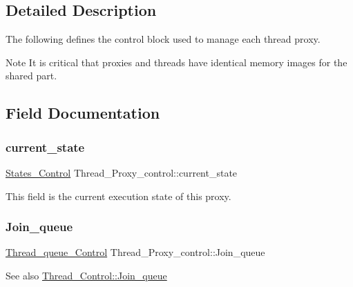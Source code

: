 \subsection{Detailed Description}
The following defines the control block used to manage each thread proxy.

\begin{DoxyNote}{Note}
It is critical that proxies and threads have identical memory images for the shared part. 
\end{DoxyNote}


\subsection{Field Documentation}
\mbox{\label{structThread__Proxy__control_a133171ded0f076118c65455a4ec6d7b9}} 
\subsubsection{\texorpdfstring{current\_state}{current\_state}}
{\footnotesize\ttfamily \mbox{\hyperlink{group__RTEMSScoreStates_gaeebbea0bfca162709b124fd519cf99d3}{States\+\_\+\+Control}} Thread\+\_\+\+Proxy\+\_\+control\+::current\+\_\+state}

This field is the current execution state of this proxy. \mbox{\label{structThread__Proxy__control_ab9d8b4de8c315ea5999b460c4c14aada}} 
\subsubsection{\texorpdfstring{Join\_queue}{Join\_queue}}
{\footnotesize\ttfamily \mbox{\hyperlink{structThread__queue__Control}{Thread\+\_\+queue\+\_\+\+Control}} Thread\+\_\+\+Proxy\+\_\+control\+::\+Join\+\_\+queue}

\begin{DoxySeeAlso}{See also}
\mbox{\hyperlink{struct__Thread__Control_a69f349249f56344621bf9a64b70bbfa9}{Thread\+\_\+\+Control\+::\+Join\+\_\+queue}} 
\end{DoxySeeAlso}
\mbox{\label{structThread__Proxy__control_a27c1eba6d174d79169af58638e173def}} 
